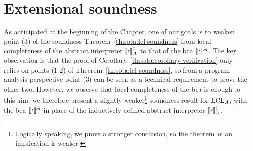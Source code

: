%

\section{Extensional soundness}
As anticipated at the beginning of the Chapter, one of our goals is to weaken point (3) of the soundness Theorem~\ref{th:sota:lcl-soundness} from local completeness of the abstract interpreter $\llbracket\mathsf{r}\rrbracket^{\sharp}_A$ to that of the bca $\llbracket\mathsf{r}\rrbracket^A$. The key observation is that the proof of Corollary~\ref{th:sota:corollary-verification} only relies on points (1-2) of Theorem~\ref{th:sota:lcl-soundness}, so from a program analysis perspective point (3) can be seen as a technical requirement to prove the other two. However, we observe that local completeness of the bca is enough to this aim: we therefore present a slightly weaker\footnote{Logically speaking, we prove a stronger conclusion, so the theorem as an implication is weaker.} soundness result for $\text{LCL}_A$, with the bca $\llbracket\mathsf{r}\rrbracket^A$ in place of the inductively defined abstract interpreter $\llbracket\mathsf{r}\rrbracket^{\sharp}_A$.

